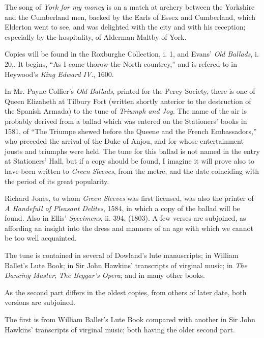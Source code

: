 The song of \textit{York for my money} is on a match at archery between the Yorkshire
and the Cumberland men, backed by the Earls of Essex and Cumberland,
which Elderton went to see, and was delighted with the city and with his
reception; especially by the hospitality, of Alderman Maltby of York.

Copies will be found in the Roxburghe Collection, i. 1, and Evans’ \textit{Old Ballads},
i. 20,. It begins, “As I come thorow the North countrey,” and is refered to in
Heywood’s \textit{King Edward IV}., 1600.

In Mr. Payne Collier’s \textit{Old Ballads}, printed for the Percy Society, there is one
of Queen Elizaheth at Tilbury Fort (written shortly anterior to the destruction of
the Spanish Armada) to the tune of \textit{Triumph and Joy}. The name of the air is
probably derived from a ballad which was entered on the Stationers’ books in
1581, of “The Triumpe shewed before the Queene and the French Embassadors,”
who preceded the arrival of the Duke of Anjou, and for whose entertainment
jousts and triumphs were held. The tune for this ballad is not named in the
entry at Stationers’ Hall, but if a copy should be found, I imagine it will prove
also to have been written to \textit{Green Sleeves}, from the metre, and the date
coinciding with the period of its great popularity.

Richard Jones, to whom \textit{Green Sleeves} was first licensed, was also the printer
of \textit{A Handefull of Pleasant Delites}, 1584, in which a copy of the ballad will be
found. Also in Ellis’ \textit{Specimens}, \pagebreak ii. 394, (1803). A few verses are subjoined,
as affording an insight into the dress and manners of an age with which we cannot
be too well acquainted.

The tune is contained in several of Dowland’s lute manuscripts; in William
Ballet’s Lute Book; in Sir John Hawkins’ transcripts of virginal music; in \textit{The
Dancing Master}; \textit{The Beggar's Opera}; and in many other books.

As the second part differs in the oldest copies, from others of later date, both
versions are subjoined.

The first is from William Ballet’s Lute Book compared with another in Sir
John Hawkins’ transcripts of virginal music; both having the older second part.


\medskip

